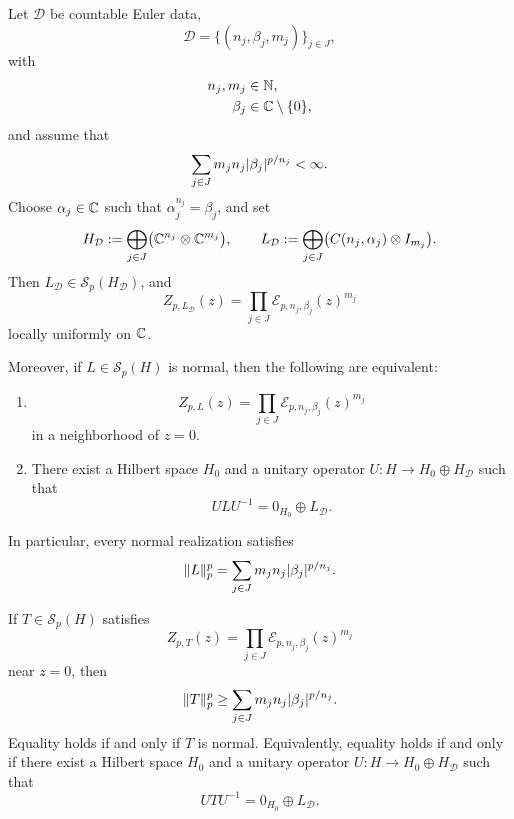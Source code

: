 \begin{theorem}
  \label{thm:schatten-regularized}
  Let \(\mathcal D\) be countable Euler data,
  \[
    \mathcal D=\{(n_j,\beta_j,m_j)\}_{j\in J},
  \]
  with
  \[
    \begin{aligned}
      n_j,m_j&\in\mathbb{N},\\
      \beta_j&\in\mathbb{C}\setminus\{0\},
    \end{aligned}
  \]
  and assume that
  \[
    \sum_{j\in J}m_jn_j\lvert \beta_j \rvert^{p/n_j}<\infty.
  \]
  Choose \(\alpha_j\in\mathbb{C}\) such that \(\alpha_j^{n_j}=\beta_j\), and
  set
  \[
    H_{\mathcal D}
    :=\bigoplus_{j\in J}\bigl(\mathbb{C}^{n_j}\otimes\mathbb{C}^{m_j}\bigr),
    \qquad
    L_{\mathcal D}
    :=\bigoplus_{j\in J}\bigl(C(n_j,\alpha_j)\otimes I_{m_j}\bigr).
  \]
  Then \(L_{\mathcal D}\in \mathcal S_p(H_{\mathcal D})\), and
  \[
    Z_{p,L_{\mathcal D}}(z)
    =\prod_{j\in J}\mathcal E_{p,n_j,\beta_j}(z)^{m_j}
  \]
  locally uniformly on \(\mathbb{C}\).

  Moreover, if \(L\in \mathcal S_p(H)\) is normal, then the following
  are equivalent:
  \begin{enumerate}[label=\textup{(\roman*)}]
    \item
      \[
        Z_{p,L}(z)
        =\prod_{j\in J}\mathcal E_{p,n_j,\beta_j}(z)^{m_j}
      \]
      in a neighborhood of \(z=0\).
    \item There exist a Hilbert space \(H_0\) and a unitary operator
      \(U:H\to H_0\oplus H_{\mathcal D}\) such that
      \[
        ULU^{-1}=0_{H_0}\oplus L_{\mathcal D}.
      \]
  \end{enumerate}
  In particular, every normal realization satisfies
  \[
    \|L\|_p^p=\sum_{j\in J}m_jn_j\lvert \beta_j \rvert^{p/n_j}.
  \]

  If \(T\in \mathcal S_p(H)\) satisfies
  \[
    Z_{p,T}(z)
    =\prod_{j\in J}\mathcal E_{p,n_j,\beta_j}(z)^{m_j}
  \]
  near \(z=0\), then
  \[
    \|T\|_p^p\ge \sum_{j\in J}m_jn_j\lvert \beta_j \rvert^{p/n_j}.
  \]
  Equality holds if and only if \(T\) is normal. Equivalently,
  equality holds if and only if there exist a Hilbert space \(H_0\) and
  a unitary operator \(U:H\to H_0\oplus H_{\mathcal D}\) such that
  \[
    UTU^{-1}=0_{H_0}\oplus L_{\mathcal D}.
  \]
\end{theorem}

